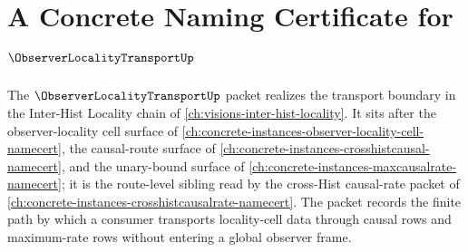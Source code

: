 \chapter{A Concrete Naming Certificate for $\ObserverLocalityTransportUp$}
\label{ch:concrete-instances-observer-locality-transport-namecert}

The $\ObserverLocalityTransportUp$ packet realizes the transport boundary in the Inter-Hist Locality chain of \autoref{ch:visions-inter-hist-locality}. It sits after the observer-locality cell surface of \autoref{ch:concrete-instances-observer-locality-cell-namecert}, the causal-route surface of \autoref{ch:concrete-instances-crosshistcausal-namecert}, and the unary-bound surface of \autoref{ch:concrete-instances-maxcausalrate-namecert}; it is the route-level sibling read by the cross-Hist causal-rate packet of \autoref{ch:concrete-instances-crosshistcausalrate-namecert}. The packet records the finite path by which a consumer transports locality-cell data through causal rows and maximum-rate rows without entering a global observer frame.

